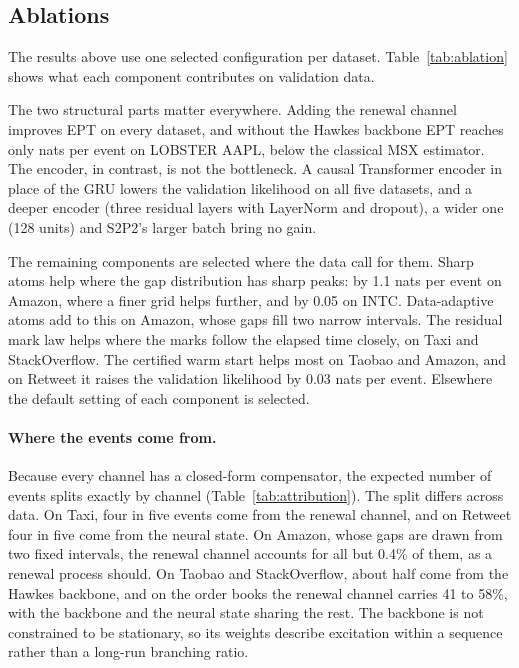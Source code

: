 \FloatBarrier
\subsection{Ablations}\label{sec:ablation}
The results above use one selected configuration per dataset. Table~\ref{tab:ablation} shows what
each component contributes on validation data.

The two structural parts matter everywhere. Adding the renewal channel improves EPT on every
dataset, and without the Hawkes backbone EPT reaches only \eptNoBackbone{} nats per event on
LOBSTER AAPL, below the classical MSX estimator. The encoder, in contrast, is not the bottleneck.
A causal Transformer encoder \citep{vaswani2017attention} in place of the GRU lowers the validation
likelihood on all five datasets, and a deeper encoder (three residual layers with LayerNorm and
dropout), a wider one (128 units) and S2P2's larger batch bring no gain.

The remaining components are selected where the data call for them. Sharp atoms help where the gap
distribution has sharp peaks: by 1.1 nats per event on Amazon, where a finer grid helps further,
and by 0.05 on INTC. Data-adaptive atoms add to this on Amazon, whose gaps fill two narrow
intervals. The residual mark law helps where the marks follow the elapsed time closely, on Taxi
and StackOverflow. The certified warm start helps most on Taobao and Amazon, and on Retweet it
raises the validation likelihood by 0.03 nats per event. Elsewhere the default setting of each
component is selected.

\paragraph{Where the events come from.} Because every channel has a closed-form compensator, the
expected number of events splits exactly by channel (Table~\ref{tab:attribution}). The split differs
across data. On Taxi, four in five events come from the renewal channel, and on Retweet four in five
come from the neural state. On Amazon, whose gaps are drawn from two fixed intervals, the renewal
channel accounts for all but 0.4\% of them, as a renewal process should. On Taobao and StackOverflow, about half come from the Hawkes backbone,
and on the order books the renewal channel carries 41 to 58\%, with the backbone and the neural state
sharing the rest. The backbone is not constrained to be stationary, so its weights
describe excitation within a sequence rather than a long-run branching ratio.

